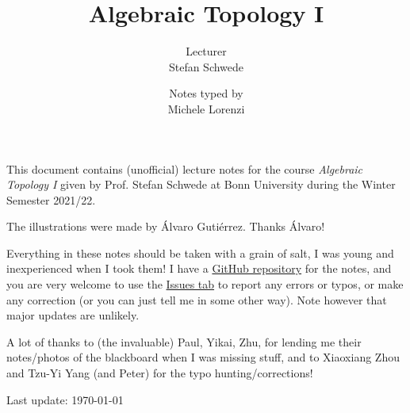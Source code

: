 \documentclass[a4paper, 10pt, oneside, DIV=9, chapterprefix=true, numbers=enddot,bibliography=totoc]{scrbook}
\title{Algebraic Topology I}
\author{{\normalsize Lecturer}\\
	Stefan Schwede}
\date{{\normalsize Notes typed by}\\
	Michele Lorenzi}
\begin{document}
\setlength{\parindent}{0pt}
\setlength{\parskip}{4pt}

\frontmatter
{}
\renewcommand{\thedummy}{\arabic{dummy}}
\maketitle
This document contains (unofficial) lecture notes for the course \emph{Algebraic Topology I} given by Prof. Stefan Schwede at Bonn University during the Winter Semester 2021/22.

The illustrations were made by \'Alvaro Guti\'errez. Thanks \'Alvaro!

Everything in these notes should be taken with a grain of salt, I was young and inexperienced when I took them! I have a \href{https://github.com/lrnmhl/AT1}{GitHub repository} for the notes, and you are very welcome to use the \href{https://github.com/lrnmhl/AT1/issues}{Issues tab} to report any errors or typos, or make any correction (or you can just tell me in some other way). Note however that major updates are unlikely.

A lot of thanks to (the invaluable) Paul, Yikai, Zhu, for lending me their notes/photos of the blackboard when I was missing stuff, and to Xiaoxiang Zhou and Tzu-Yi Yang (and Peter) for the typo hunting/corrections!

\hrulefill

Last update: \today
	
	
	
\tableofcontents
{}
\setcounter{llecture}{0}
\mainmatter{}
\renewcommand{\thedummy}{\thechapter.\arabic{dummy}}
\renewcommand{\thechapter}{\arabic{chapter}}






























\nocite{*}


\backmatter{}
\printbibliography[heading=bibintoc, title={References}]
\end{document}
